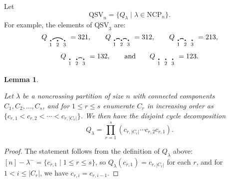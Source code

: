 \documentclass[12pt]{amsart}
\newtheorem{lem}[equation]{Lemma}
\theoremstyle{definition}
\theoremstyle{remark}
\numberwithin{equation}{section}
\renewcommand{\setminus}{-}
\newcommand{\QSV}{\mathrm{QSV}}
\newcommand{\NCP}{\mathrm{NCP}}
\begin{document}
Let
\[
\QSV_{n} = \{Q_{\lambda} \;|\; \lambda \in \NCP_{n} \}.
\]
For example, the elements of $\QSV_{3}$ are:
\[
Q_{\begin{tikzpicture}[scale = 0.35, baseline = 0.35*-0.2]
\foreach \x in {1, ..., 3}{\draw[fill] (\x - 1, 0) circle (2pt) node[inner sep = 2pt] (\x) {};}
\foreach \x in {1, ..., 3}{\node[below] at (\x) {$\scriptstyle \x$};}
\foreach \i\j in {1/3}{\draw[thick] (\i) to[out = 35, in = 145] (\j);}
\end{tikzpicture}} = 321, \qquad
Q_{\begin{tikzpicture}[scale = 0.35, baseline = 0.35*-0.2]
\foreach \x in {1, ..., 3}{\draw[fill] (\x - 1, 0) circle (2pt) node[inner sep = 2pt] (\x) {};}
\foreach \x in {1, ..., 3}{\node[below] at (\x) {$\scriptstyle \x$};}
\foreach \i\j in {1/2, 2/3}{\draw[thick] (\i) to[out = 35, in = 145] (\j);}
\end{tikzpicture}} = 312, \qquad
Q_{\begin{tikzpicture}[scale = 0.35, baseline = 0.35*-0.2]
\foreach \x in {1, ..., 3}{\draw[fill] (\x - 1, 0) circle (2pt) node[inner sep = 2pt] (\x) {};}
\foreach \x in {1, ..., 3}{\node[below] at (\x) {$\scriptstyle \x$};}
\foreach \i\j in {1/2}{\draw[thick] (\i) to[out = 35, in = 145] (\j);}
\end{tikzpicture}} = 213, 
\]
\[
Q_{\begin{tikzpicture}[scale = 0.35, baseline = 0.35*-0.2]
\foreach \x in {1, ..., 3}{\draw[fill] (\x - 1, 0) circle (2pt) node[inner sep = 2pt] (\x) {};}
\foreach \x in {1, ..., 3}{\node[below] at (\x) {$\scriptstyle \x$};}
\foreach \i\j in {2/3}{\draw[thick] (\i) to[out = 35, in = 145] (\j);}
\end{tikzpicture}} = 132, \qquad\text{and}\qquad
Q_{\begin{tikzpicture}[scale = 0.35, baseline = 0.35*-0.2]
\foreach \x in {1, ..., 3}{\draw[fill] (\x - 1, 0) circle (2pt) node[inner sep = 2pt] (\x) {};}
\foreach \x in {1, ..., 3}{\node[below] at (\x) {$\scriptstyle \x$};}
\end{tikzpicture}} = 123.
\]

\begin{lem}
\label{lem:QSVcycles}

Let $\lambda$ be a noncrossing partition of size $n$ with connected components $C_{1}, C_{2}, \ldots, C_{s}$, and for $1 \le r \le s$ enumerate $C_{r}$ in increasing order as $\{c_{r, 1} < c_{r, 2} < \cdots < c_{r, |C_{r}|}\}$. 
We then have the disjoint cycle decomposition
\[
Q_{\lambda} = \prod_{r = 1}^{s} (c_{r, |C_{r}|} \cdots c_{r, 2} c_{r, 1} ).
\]
\end{lem}
\begin{proof}
The statement follows from the definition of $Q_{\lambda}$ above: $[n] \setminus \lambda^{-} = \{c_{r, 1} \;|\; 1 \le r \le s\}$, so $Q_{\lambda}(c_{r, 1}) =  c_{r, |C_{r}|}$ for each $r$, and for $1 < i \le |C_{r}|$, we have $c_{r, i} = c_{r, i-1}$.
\end{proof}
\end{document}
